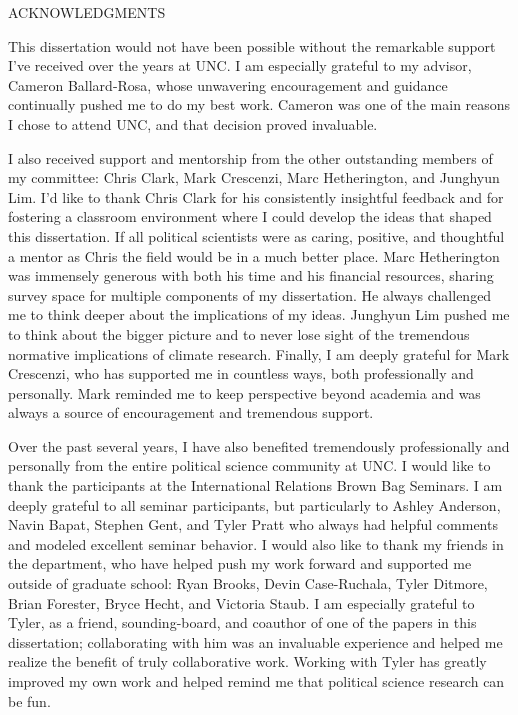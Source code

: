 
\begin{center}
\vspace*{52pt}
{ACKNOWLEDGMENTS}
\end{center}

This dissertation would not have been possible without the remarkable support I’ve received over the years at UNC. I am especially grateful to my advisor, Cameron Ballard-Rosa, whose unwavering encouragement and guidance continually pushed me to do my best work. Cameron was one of the main reasons I chose to attend UNC, and that decision proved invaluable. 

I also received support and mentorship from the other outstanding members of my committee: Chris Clark, Mark Crescenzi, Marc Hetherington, and Junghyun Lim. I'd like to thank Chris Clark for his consistently insightful feedback and for fostering a classroom environment where I could develop the ideas that shaped this dissertation. If all political scientists were as caring, positive, and thoughtful a mentor as Chris the field would be in a much better place. Marc Hetherington was immensely generous with both his time and his financial resources, sharing survey space for multiple components of my dissertation. He always challenged me to think deeper about the implications of my ideas. Junghyun Lim pushed me to think about the bigger picture and to never lose sight of the tremendous normative implications of climate research. Finally, I am deeply grateful for Mark Crescenzi, who has supported me in countless ways, both professionally and personally. Mark reminded me to keep perspective beyond academia and was always a source of encouragement and tremendous support.

Over the past several years, I have also benefited tremendously professionally and personally from the entire political science community at UNC. I would like to thank the participants at the International Relations Brown Bag Seminars. I am deeply grateful to all seminar participants, but particularly to Ashley Anderson, Navin Bapat, Stephen Gent, and Tyler Pratt who always had helpful comments and modeled excellent seminar behavior. I would also like to thank my friends in the department, who have helped push my work forward and supported me outside of graduate school: Ryan Brooks, Devin Case-Ruchala, Tyler Ditmore, Brian Forester, Bryce Hecht, and Victoria Staub. I am especially grateful to Tyler, as a friend, sounding-board, and coauthor of one of the papers in this dissertation; collaborating with him was an invaluable experience and helped me realize the benefit of truly collaborative work. Working with Tyler has greatly improved my own work and helped remind me that political science research can be fun. 

